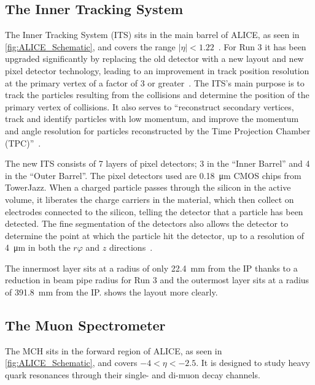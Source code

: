 \subsection{The Inner Tracking System}
The Inner Tracking System (ITS) sits in the main barrel of ALICE, as seen in \cref{fig:ALICE_Schematic}, and covers the range $|\eta|<1.22$~\cite{ITS_Upgrade_TDR}. For Run 3 it has been upgraded significantly by replacing the old detector with a new layout and new pixel detector technology, leading to an improvement in track position resolution at the primary vertex of a factor of 3 or greater~\cite{ITS_Upgrade_TDR}. The ITS's main purpose is to track the particles resulting from the collisions and determine the position of the primary vertex of collisions. It also serves to ``reconstruct secondary vertices, track and identify particles with low momentum, and improve the momentum and angle resolution for particles reconstructed by the Time Projection Chamber (TPC)''~\cite{ITS_Info}.


The new ITS consists of 7 layers of pixel detectors; 3 in the ``Inner Barrel'' and 4 in the ``Outer Barrel''. The pixel detectors used are \SI{0.18}{\micro\metre} CMOS chips from TowerJazz. When a charged particle passes through the silicon in the active volume, it liberates the charge carriers in the material, which then collect on electrodes connected to the silicon, telling the detector that a particle has been detected. The fine segmentation of the detectors also allows the detector to determine the point at which the particle hit the detector, up to a resolution of \SI{4}{\micro\metre} in both the $r\varphi$ and $z$ directions~\cite{ITS_Upgrade_TDR}.

The innermost layer sits at a radius of only \SI{22.4}{\milli\metre} from the IP thanks to a reduction in beam pipe radius for Run 3 and the outermost layer sits at a radius of \SI{391.8}{\milli\metre} from the IP.  shows the layout more clearly. 

\subsection{The Muon Spectrometer}
The MCH sits in the forward region of ALICE, as seen in \cref{fig:ALICE_Schematic}, and covers $-4<\eta<-2.5$. It is designed to study heavy quark resonances through their single- and di-muon decay channels.

